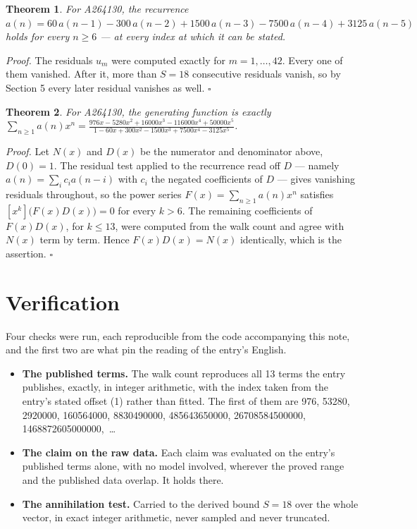 \documentclass[11pt]{article}
\newtheorem{theorem}{Theorem}
\theoremstyle{definition}
\begin{document}
\begin{theorem} For A264130, the recurrence $a(n) = 60\,a(n-1) - 300\,a(n-2) + 1500\,a(n-3) - 7500\,a(n-4) + 3125\,a(n-5)$ holds for every $n \ge 6$ --- at every index at which it can be stated.\end{theorem}

{\itshape Proof.} The residuals $u_m$ were computed exactly for $m = 1,\dots,42$. Every one of them vanished. After it, more than $S = 18$ consecutive residuals vanish, so by Section 5 every later residual vanishes as well. $\square$

\begin{theorem} For A264130, the generating function is exactly $\sum_{n\ge 1} a(n)x^n = \frac{976x - 5280x^{2} + 16000x^{3} - 116000x^{4} + 50000x^{5}}{1 - 60x + 300x^{2} - 1500x^{3} + 7500x^{4} - 3125x^{5}}$.\end{theorem}

{\itshape Proof.} Let $N(x)$ and $D(x)$ be the numerator and denominator above, $D(0)=1$. The residual test applied to the recurrence read off $D$ --- namely $a(n) = \sum_i c_i a(n-i)$ with $c_i$ the negated coefficients of $D$ --- gives vanishing residuals throughout, so the power series $F(x)=\sum_{n\ge 1}a(n)x^n$ satisfies $[x^k]\bigl(F(x)D(x)\bigr) = 0$ for every $k > 6$. The remaining coefficients of $F(x)D(x)$, for $k \le 13$, were computed from the walk count and agree with $N(x)$ term by term. Hence $F(x)D(x) = N(x)$ identically, which is the assertion. $\square$

\section{Verification}

Four checks were run, each reproducible from the code accompanying this note, and the first two are what pin the reading of the entry's English.

\begin{itemize}

\item {\bfseries The published terms.} The walk count reproduces all 13 terms the entry publishes, exactly, in integer arithmetic, with the index taken from the entry's stated offset (1) rather than fitted. The first of them are 976, 53280, 2920000, 160564000, 8830490000, 485643650000, 26708584500000, 1468872605000000,~\dots

\item {\bfseries The claim on the raw data.} Each claim was evaluated on the entry's published terms alone, with no model involved, wherever the proved range and the published data overlap. It holds there.

\item {\bfseries The annihilation test.} Carried to the derived bound $S = 18$ over the whole vector, in exact integer arithmetic, never sampled and never truncated.

\end{itemize}
\end{document}
